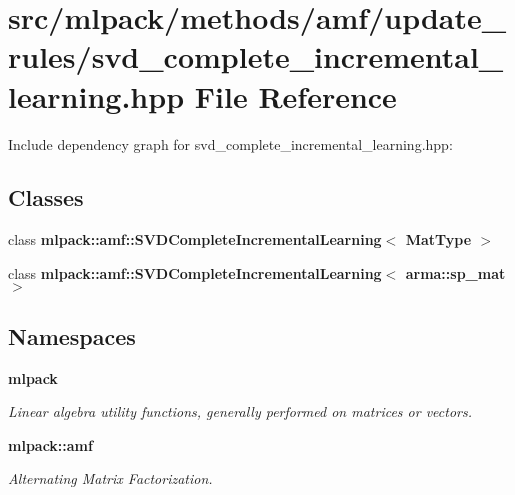 \section{src/mlpack/methods/amf/update\-\_\-rules/svd\-\_\-complete\-\_\-incremental\-\_\-learning.hpp File Reference}
\label{svd__complete__incremental__learning_8hpp}
Include dependency graph for svd\-\_\-complete\-\_\-incremental\-\_\-learning.\-hpp\-:
\subsection*{Classes}
\begin{DoxyCompactItemize}
\item 
class {\bf mlpack\-::amf\-::\-S\-V\-D\-Complete\-Incremental\-Learning$<$ Mat\-Type $>$}
\item 
class {\bf mlpack\-::amf\-::\-S\-V\-D\-Complete\-Incremental\-Learning$<$ arma\-::sp\-\_\-mat $>$}
\end{DoxyCompactItemize}
\subsection*{Namespaces}
\begin{DoxyCompactItemize}
\item 
{\bf mlpack}
\begin{DoxyCompactList}\small\item\em Linear algebra utility functions, generally performed on matrices or vectors. \end{DoxyCompactList}\item 
{\bf mlpack\-::amf}
\begin{DoxyCompactList}\small\item\em Alternating Matrix Factorization. \end{DoxyCompactList}\end{DoxyCompactItemize}

